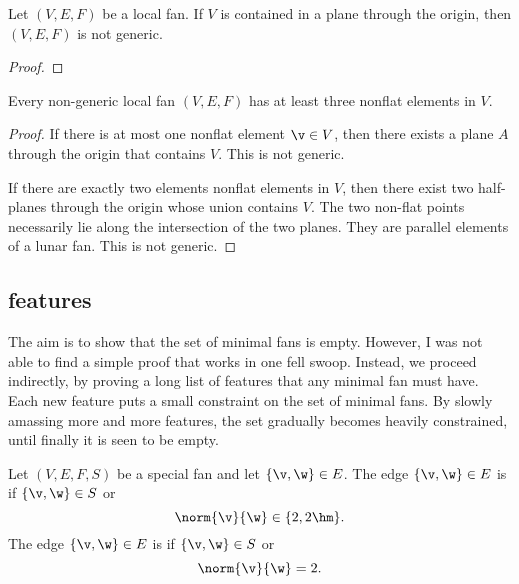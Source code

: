 \begin{lemma}[]
Let $(V,E,F)$ be a local fan.  If $V$ is contained in a plane
through the origin, then $(V,E,F)$ is not generic.
\end{lemma}

\begin{proof}
\end{proof}

\begin{lemma}[]\label{lemma:3-nonflat}
Every non-generic local fan $(V,E,F)$ has at least three nonflat
elements in $V$.
\end{lemma}

\begin{proof}
If there is at most one nonflat element $\v\in V$, then there exists
a plane $A$ through the origin that contains $V$.  This is not
generic.

If there are exactly two elements nonflat elements in $V$, then
there exist two half-planes through the origin whose union contains
$V$.  The two non-flat points necessarily lie along the intersection
of the two planes.  They are parallel elements of a lunar fan.
This is not generic.
\end{proof}

\subsection{features}

\begin{summary}  The aim is to show that the set of minimal fans is empty.  However,
I was not able to find a simple proof that works in one fell swoop.  Instead, we proceed indirectly,
by proving a long list of features that any minimal fan must have.  Each new feature
puts a small constraint on the set of minimal fans.  By slowly amassing more and more
features, the set gradually becomes heavily constrained, until finally it is seen to be empty.
\end{summary}


\begin{definition}
 Let $(V,E,F,S)$ be a special fan
and let $\{\v,\w\}\in E$.  The edge $\{\v,\w\}\in E$ is
 if $\{\v,\w\}\in S$ or
\begin{displaymath}
\norm{\v}{\w}\in\{2,2\hm\}.
\end{displaymath}
The edge $\{\v,\w\}\in E$ is  if $\{\v,\w\}\in S$ or
\begin{displaymath}
\norm{\v}{\w}=2.
\end{displaymath}
\end{definition}

